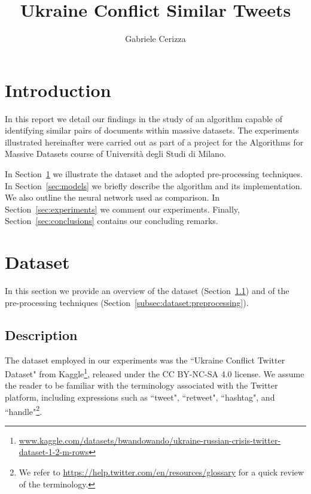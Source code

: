 \documentclass[runningheads]{llncs}
\begin{document}
\title{
    Ukraine Conflict Similar Tweets
}
\author{Gabriele Cerizza}


\maketitle

\section*{Introduction}
\label{sec:introduction}

In this report we detail our findings in the study of an algorithm capable of identifying similar pairs of documents within massive datasets. The experiments illustrated hereinafter were carried out as part of a project for the Algorithms for Massive Datasets course of Università degli Studi di Milano.

In Section~\ref{sec:dataset} we illustrate the dataset and the adopted pre-processing techniques. In Section~\ref{sec:models} we briefly describe the algorithm and its implementation. We also outline the neural network used as comparison. In Section~\ref{sec:experiments} we comment our experiments. Finally, Section~\ref{sec:conclusions} contains our concluding remarks.

\section{Dataset}
\label{sec:dataset}

In this section we provide an overview of the dataset (Section~\ref{subsec:dataset:description}) and of the pre-processing techniques (Section~\ref{subsec:dataset:preprocessing}).

\subsection{Description}
\label{subsec:dataset:description}

The dataset employed in our experiments was the “Ukraine Conflict Twitter Dataset" from Kaggle\footnote{\url{www.kaggle.com/datasets/bwandowando/ukraine-russian-crisis-twitter-dataset-1-2-m-rows}}, released under the CC BY-NC-SA 4.0 license. We assume the reader to be familiar with the terminology associated with the Twitter platform, including expressions such as “tweet", “retweet", “hashtag", and “handle"\footnote{We refer to \url{https://help.twitter.com/en/resources/glossary} for a quick review of the terminology.}.
\end{document}
